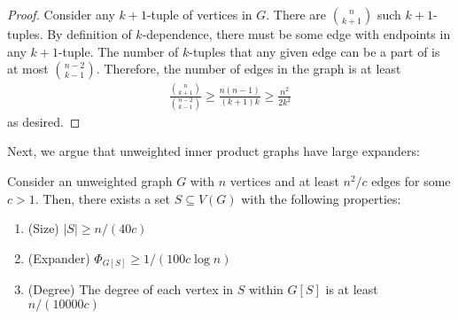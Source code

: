\begin{proof}
Consider any $k+1$-tuple of vertices in $G$. There are $\binom{n}{k+1}$ such $k+1$-tuples. By definition of $k$-dependence, there must be some edge with endpoints in any $k+1$-tuple. The number of $k$-tuples that any given edge can be a part of is at most $\binom{n-2}{k-1}$. Therefore, the number of edges in the graph is at least
\begin{align*}
\frac{ \binom{n}{k+1} }{ \binom{n-2}{k-1} } \ge \frac{ n(n-1)}{ (k+1)k } \ge \frac{ n^2 }{ 2k^2 }
\end{align*}
as desired.
\end{proof}

Next, we argue that unweighted inner product graphs have large expanders:

\begin{proposition}\label{prop:dense-has-expander}
Consider an unweighted graph $G$ with $n$ vertices and at least $n^2/c$ edges for some $c > 1$. Then, there exists a set $S\subseteq V(G)$ with the following properties:

\begin{enumerate}
    \item (Size) $|S|\ge n/(40c)$
    \item (Expander) $\Phi_{G[S]}\ge 1/(100c\log n)$
    \item (Degree) The degree of each vertex in $S$ within $G[S]$ is at least $n/(10000c)$
\end{enumerate}

\end{proposition}

